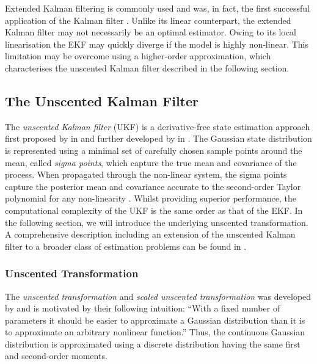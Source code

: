 Extended Kalman filtering is commonly used and was, in fact, the first successful application of the Kalman filter \cite{grewal2008kalman}. Unlike its linear counterpart, the extended Kalman filter may not necessarily be an optimal estimator. Owing to its local linearisation the EKF may quickly diverge if the model is highly non-linear. This limitation may be overcome using a higher-order approximation, which characterises the unscented Kalman filter described in the following section.


\subsection{The Unscented Kalman Filter}\label{sec:unscented_kalman}

The \emph{unscented Kalman filter} (UKF) is a derivative-free state estimation approach first proposed by \citeauthor{julier1997ukf} in \cite{julier1997ukf} and further developed by \citeauthor{wan2000unscented} in \cite{wan2000unscented}. The Gaussian state distribution is represented using a minimal set of carefully chosen sample points around the mean, called \emph{sigma points}, which capture the true mean and covariance of the process. When propagated through the non-linear system, the sigma points capture the posterior mean and covariance accurate to the second-order Taylor polynomial for any non-linearity \cite{gustafsson2012some}. Whilst providing superior performance, the computational complexity of the UKF is the same order as that of the EKF. In the following section, we will introduce the underlying unscented transformation. A comprehensive description including an extension of the unscented Kalman filter to a broader class of estimation problems can be found in \cite{wan2001unscented}.

\subsubsection{Unscented Transformation}

The \emph{unscented transformation} \cite{Julier96ageneral} and \emph{scaled unscented transformation} \cite{julier2002scaled} was developed by \citeauthor{Julier96ageneral} and is motivated by their following intuition: ``With a fixed number of parameters it should be easier to approximate a Gaussian distribution than it is to approximate an arbitrary nonlinear function.'' Thus, the continuous Gaussian distribution is approximated using a discrete distribution having the same first and second-order moments.

